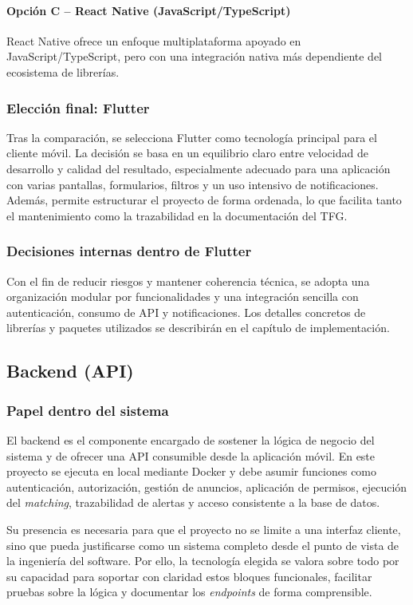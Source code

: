 \documentclass[12pt,a4paper]{report}
\begin{document}
\paragraph{Opción C -- React Native (JavaScript/TypeScript)}
React Native ofrece un enfoque multiplataforma apoyado en JavaScript/TypeScript, pero con una integración nativa más dependiente del ecosistema de librerías.

\subsubsection{Elección final: Flutter}
Tras la comparación, se selecciona Flutter como tecnología principal para el cliente móvil. La decisión se basa en un equilibrio claro entre velocidad de desarrollo y calidad del resultado, especialmente adecuado para una aplicación con varias pantallas, formularios, filtros y un uso intensivo de notificaciones. Además, permite estructurar el proyecto de forma ordenada, lo que facilita tanto el mantenimiento como la trazabilidad en la documentación del TFG.

\subsubsection{Decisiones internas dentro de Flutter}
Con el fin de reducir riesgos y mantener coherencia técnica, se adopta una organización modular por funcionalidades y una integración sencilla con autenticación, consumo de API y notificaciones. Los detalles concretos de librerías y paquetes utilizados se describirán en el capítulo de implementación.

\subsection{Backend (API)}

\subsubsection{Papel dentro del sistema}
El backend es el componente encargado de sostener la lógica de negocio del sistema y de ofrecer una API consumible desde la aplicación móvil. En este proyecto se ejecuta en local mediante Docker y debe asumir funciones como autenticación, autorización, gestión de anuncios, aplicación de permisos, ejecución del \textit{matching}, trazabilidad de alertas y acceso consistente a la base de datos.

Su presencia es necesaria para que el proyecto no se limite a una interfaz cliente, sino que pueda justificarse como un sistema completo desde el punto de vista de la ingeniería del software. Por ello, la tecnología elegida se valora sobre todo por su capacidad para soportar con claridad estos bloques funcionales, facilitar pruebas sobre la lógica y documentar los \textit{endpoints} de forma comprensible.
\end{document}
